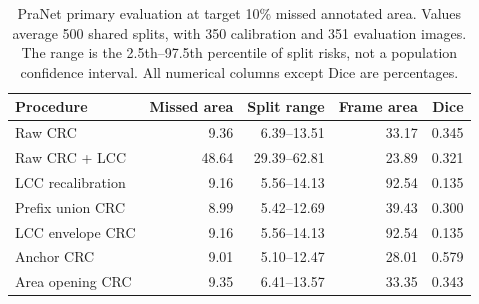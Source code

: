 \begin{table}[htbp]\centering\small
\caption{PraNet primary evaluation at target 10\% missed annotated area. Values average 500 shared splits, with 350 calibration and 351 evaluation images. The range is the 2.5th--97.5th percentile of split risks, not a population confidence interval. All numerical columns except Dice are percentages.}
\label{tab:primary}
\begin{tabular}{lrrrr}\toprule
Procedure & Missed area & Split range & Frame area & Dice\\\midrule
Raw CRC & 9.36 & 6.39--13.51 & 33.17 & 0.345 \\
Raw CRC + LCC & 48.64 & 29.39--62.81 & 23.89 & 0.321 \\
LCC recalibration & 9.16 & 5.56--14.13 & 92.54 & 0.135 \\
Prefix union CRC & 8.99 & 5.42--12.69 & 39.43 & 0.300 \\
LCC envelope CRC & 9.16 & 5.56--14.13 & 92.54 & 0.135 \\
Anchor CRC & 9.01 & 5.10--12.47 & 28.01 & 0.579 \\
Area opening CRC & 9.35 & 6.41--13.57 & 33.35 & 0.343 \\
\bottomrule\end{tabular}\end{table}
